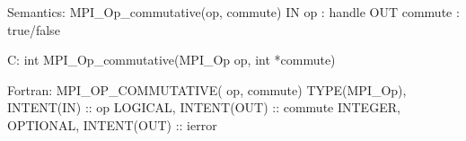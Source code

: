 Semantics:
MPI_Op_commutative(op, commute)
IN  op : handle
OUT commute : true/false

C:
int MPI_Op_commutative(MPI_Op op, int *commute)

Fortran:
MPI_OP_COMMUTATIVE( op, commute)
TYPE(MPI_Op), INTENT(IN) :: op
LOGICAL, INTENT(OUT) ::  commute
INTEGER, OPTIONAL, INTENT(OUT) ::  ierror
